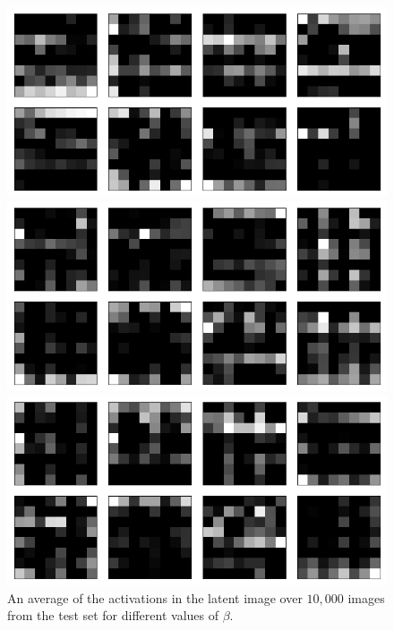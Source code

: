 \begin{figure}[h!]
\centering
\captionsetup{justification=centering}

    \includegraphics[scale=0.42]{figures/results/colour_separated/beta_1_average_activation.png}
    \caption{$\beta=1$}
    \includegraphics[scale=0.42]{figures/results/colour_separated/beta_2_average_activation.png}
    \caption{$\beta=2$}
    \includegraphics[scale=0.42]{figures/results/colour_separated/beta_4_average_activation.png}
    \caption{$\beta=4$}

\caption{An average of the activations in the latent image over $10,000$ images from the test set for different values of $\beta$.}
\label{fig:weighted_average_originals_posterior_samples}
\end{figure}


